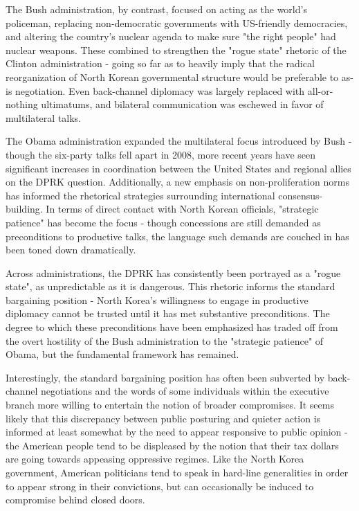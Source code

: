 \documentclass{article}
\begin{document}
The Bush administration, by contrast, focused on acting as the world's policeman, replacing non-democratic governments with US-friendly democracies, and altering the country's nuclear agenda to make sure "the right people" had nuclear weapons. These combined to strengthen the "rogue state" rhetoric of the Clinton administration - going so far as to heavily imply that the radical reorganization of North Korean governmental structure would be preferable to as-is negotiation. Even back-channel diplomacy was largely replaced with all-or-nothing ultimatums, and bilateral communication was eschewed in favor of multilateral talks.

The Obama administration expanded the multilateral focus introduced by Bush - though the six-party talks fell apart in 2008, more recent years have seen significant increases in coordination between the United States and regional allies on the DPRK question. Additionally, a new emphasis on non-proliferation norms has informed the rhetorical strategies surrounding international consensus-building. In terms of direct contact with North Korean officials, "strategic patience" has become the focus - though concessions are still demanded as preconditions to productive talks, the language such demands are couched in has been toned down dramatically.

Across administrations, the DPRK has consistently been portrayed as a "rogue state", as unpredictable as it is dangerous. This rhetoric informs the standard bargaining position - North Korea's willingness to engage in productive diplomacy cannot be trusted until it has met substantive preconditions. The degree to which these preconditions have been emphasized has traded off from the overt hostility of the Bush administration to the "strategic patience" of Obama, but the fundamental framework has remained. 

Interestingly, the standard bargaining position has often been subverted by back-channel negotiations and the words of some individuals within the executive branch more willing to entertain the notion of broader compromises. It seems likely that this discrepancy between public posturing and quieter action is informed at least somewhat by the need to appear responsive to public opinion - the American people tend to be displeased by the notion that their tax dollars are going towards appeasing oppressive regimes. Like the North Korea government, American politicians tend to speak in hard-line generalities in order to appear strong in their convictions, but can occasionally be induced to compromise behind closed doors.
\end{document}
